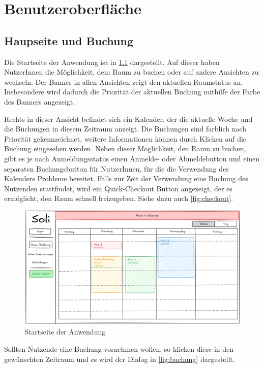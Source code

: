 
\chapter{Benutzeroberfläche}
\label{chap:ui}

\section{Haupseite und Buchung}

Die Startseite der Anwendung ist in \ref{fig:startseite} dargestellt.
Auf dieser haben NutzerInnen die Möglichkeit, dem Raum zu buchen oder auf andere Ansichten zu wechseln.
Der Banner in allen Ansichten zeigt den aktuellen Raumstatus an.
Insbesondere wird dadurch die Priorität der aktuellen Buchung mithilfe der Farbe des Banners angezeigt.

Rechts in dieser Ansicht befindet sich ein Kalender, der die aktuelle Woche und die Buchungen in diesem Zeitraum anzeigt.
Die Buchungen sind farblich nach Priorität gekennzeichnet, weitere Informationen können durch Klicken auf die Buchung eingesehen werden.
Neben dieser Möglichkeit, den Raum zu buchen, gibt es je nach Anmeldungsstatus einen Anmelde- oder Abmeldebutton und einen separaten Buchungsbutton für NutzerInnen,
für die die Verwendung des Kalenders Probleme bereitet.
Falls zur Zeit der Verwendung eine Buchung des Nutzenden stattfindet, wird ein Quick-Checkout Button angezeigt,
der es ermöglicht, den Raum schnell freizugeben.
Siehe dazu auch \ref{fig:checkout}.
\clearpage
\begin{figure}[ht]
    \centering
    \includegraphics[scale=0.15]{figures/ui/startseite}
    \caption{Startseite der Anwendung}
    \label{fig:startseite}
\end{figure}

Sollten Nutzende eine Buchung vornehmen wollen, so klicken diese in den gewünschten Zeitraum
und es wird der Dialog in \ref{fig:buchung} dargestellt.


